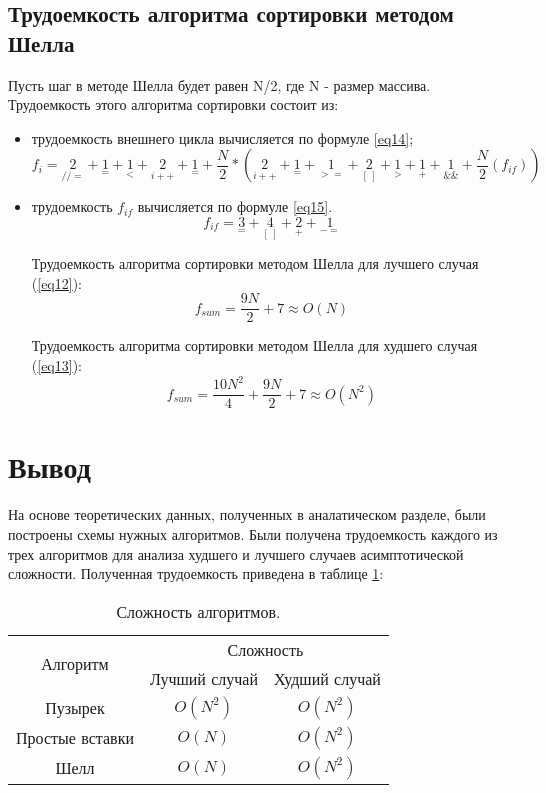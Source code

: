 \subsection{Трудоемкость алгоритма сортировки методом Шелла}
Пусть шаг в методе Шелла будет равен N/2, где N - размер массива. Трудоемкость этого алгоритма сортировки состоит из:
\begin{itemize}
	\item трудоемкость внешнего цикла вычисляется по формуле \ref{eq14};
	\begin{equation}
		\label{eq14}
		f_{i} = {\underset{//=}{2}} + {\underset{=}{1}} + {\underset{<}{1}} +  
		{\underset{i++}{2}} + {\underset{=}{1}} +  \frac{N}{2} * ({\underset{i++}{2}} + {\underset{=}{1}} + {\underset{>=}{1}} + {\underset{[\ ]}{2}} + {\underset{>}{1}} + {\underset{+}{1}} + {\underset{\&\&}{1}} + \frac{N}{2} (f_{if}))
	\end{equation}
	\item трудоемкость $f_{if}$ вычисляется по формуле \ref{eq15}.
	\begin{equation}
		\label{eq15}
		f_{if} = {\underset{=}{3}} + {\underset{[\ ]}{4}} + {\underset{+}{2}} + {\underset{-=}{1}}
	\end{equation}

	Трудоемкость алгоритма сортировки методом Шелла для лучшего случая (\ref{eq12}):
	\begin{equation}
		\label{eq12}
		f_{sum} = \frac{9N}{2} + 7 \approx O(N)
	\end{equation}
	
	Трудоемкость алгоритма сортировки методом Шелла для худшего случая (\ref{eq13}):
	\begin{equation}
		\label{eq13}
		f_{sum} = \frac{10N^2}{4} + \frac{9N}{2} + 7 \approx O(N^2)
	\end{equation}
\end{itemize}

\section*{Вывод}
На основе теоретических данных, полученных в аналатическом разделе, были построены схемы нужных алгоритмов. Были получена трудоемкость каждого из трех алгоритмов для анализа худшего и лучшего случаев асимптотической сложности. Полученная трудоемкость приведена в таблице \ref{table:ref1}:

\begin{table}[ht!]
	\centering
	\captionsetup{singlelinecheck = false, justification=raggedleft}
	\caption{Сложность алгоритмов.}
	\label{table:ref1}
	\begin{tabular}{|c|c|c|}
		\hline
		\multirow{2}{*}{Алгоритм}& \multicolumn{2}{|c|}{Сложность} \\ \cline{2-3} 
		                         & Лучший случай & Худший случай \\
		\hline
		Пузырек & $O(N^2)$  & $O(N^2)$ \\
		\hline
		Простые вставки & $O(N)$  & $O(N^2)$ \\
		\hline
		Шелл & $O(N)$  & $O(N^2)$ \\
		\hline
	\end{tabular}
\end{table}